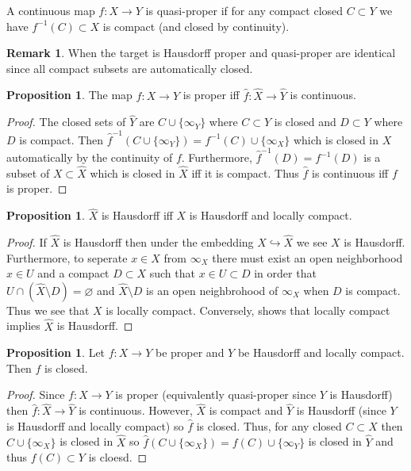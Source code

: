 \documentclass[12pt]{extarticle}
\theoremstyle{definition}
\newtheorem{proposition}[theorem]{Proposition}
\newtheorem{remark}{Remark}
\newenvironment{definition}[1][Definition:]{\begin{trivlist}
\item[\hskip \labelsep {\bfseries #1}]}{\end{trivlist}}
\newcommand{\embed}{\hookrightarrow}
\begin{document}
\begin{definition}
A continuous map $f : X \to Y$ is quasi-proper if for any compact closed $C \subset Y$ we have $f^{-1}(C) \subset X$ is compact (and closed by continuity).
\end{definition} 

\begin{remark}
When the target is Hausdorff proper and quasi-proper are identical since all compact subsets are automatically closed. 
\end{remark}

\begin{proposition}
The map $f : X \to Y$ is proper iff $\hat{f} : \hat{X} \to \hat{Y}$ is continuous.
\end{proposition}

\begin{proof}
The closed sets of $\hat{Y}$ are $C \cup \{ \infty_Y \}$ where $C \subset Y$ is closed and $D \subset Y$ where $D$ is compact. Then $\hat{f}^{-1}(C \cup \{ \infty_Y \}) = f^{-1}(C) \cup \{ \infty_X \}$ which is closed in $X$ automatically by the continuity of $f$. Furthermore, $\hat{f}^{-1}(D) = f^{-1}(D)$ is a subset of $X \subset \hat{X}$ which is closed in $\hat{X}$ iff it is compact. Thus $\hat{f}$ is continuous iff $f$ is proper. 
\end{proof}

\begin{proposition}
$\hat{X}$ is Hausdorff iff $X$ is Hausdorff and locally compact.
\end{proposition}

\begin{proof}
If $\hat{X}$ is Hausdorff then under the embedding $X \embed \hat{X}$ we see $X$ is Hausdorff. Furthermore, to seperate $x \in X$ from $\infty_X$ there must exist an open neighborhood $x \in U$ and a compact $D \subset X$ such that $x \in U \subset D$ in order that $U \cap (\hat{X} \setminus D) = \varnothing$ and $\hat{X} \setminus D$ is an open neighbrohood of $\infty_X$ when $D$ is compact. Thus we see that $X$ is locally compact. Conversely, shows that locally compact implies $\hat{X}$ is Hausdorff. 
\end{proof}

\begin{proposition}
Let $f : X \to Y$ be proper and $Y$ be Hausdorff and locally compact. Then $f$ is closed. 
\end{proposition}

\begin{proof}
Since $f : X \to Y$ is proper (equivalently quasi-proper since $Y$ is Hausdorff) then $\hat{f} : \hat{X} \to \hat{Y}$ is continuous. However, $\hat{X}$ is compact and $\hat{Y}$ is Hausdorff (since $Y$ is Hausdorff and locally compact) so $\hat{f}$ is closed. Thus, for any closed $C \subset X$ then $C \cup \{ \infty_X \}$ is closed in $\hat{X}$ so $\hat{f}(C \cup \{\infty_X \}) = f(C) \cup \{ \infty_Y \}$ is closed in $\hat{Y}$ and thus $f(C) \subset Y$ is cloesd.
\end{proof}
\end{document}
